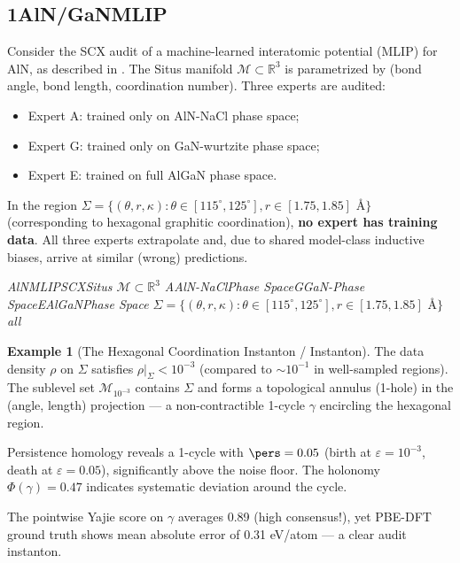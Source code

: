 \documentclass[11pt,a4paper]{article}
\theoremstyle{plain}
\theoremstyle{definition}
\newtheorem{example}[theorem]{Example}
\newcommand{\R}{\mathbb{R}}
\newcommand{\cM}{\mathcal{M}}
\begin{document}
\subsection*{1AlN/GaNMLIP}

Consider the SCX audit of a machine-learned interatomic potential (MLIP) 
for AlN, as described in \cite{scx_framework}. The Situs manifold 
$\cM \subset \R^3$ is parametrized by (bond angle, bond length, coordination 
number). Three experts are audited:

\begin{itemize}
  \item Expert A: trained only on AlN-NaCl phase space;
  \item Expert G: trained only on GaN-wurtzite phase space;
  \item Expert E: trained on full AlGaN phase space.
\end{itemize}

In the region $\Sigma = \{(\theta, r, \kappa) : \theta \in [115^{\circ}, 125^{\circ}], 
r \in [1.75, 1.85] \text{ \AA}\}$ (corresponding to hexagonal graphitic 
coordination), \textbf{no expert has training data}. All three experts 
extrapolate and, due to shared model-class inductive biases, arrive at 
similar (wrong) predictions.

\bigskip
\noindent
\textit{AlNMLIPSCXSitus $\cM \subset \R^3$ AAlN-NaClPhase SpaceGGaN-Phase SpaceEAlGaNPhase Space $\Sigma = \{(\theta, r, \kappa) : \theta \in [115^{\circ}, 125^{\circ}], r \in [1.75, 1.85] \text{ \AA}\}$\textbf{}all}

\begin{example}[The Hexagonal Coordination Instanton / Instanton]
\label{ex:hexagonal}
The data density $\rho$ on $\Sigma$ satisfies $\rho|_{\Sigma} < 10^{-3}$ 
(compared to $\sim 10^{-1}$ in well-sampled regions). The sublevel set 
$\cM_{10^{-3}}$ contains $\Sigma$ and forms a topological annulus 
(1-hole) in the (angle, length) projection — a non-contractible 1-cycle 
$\gamma$ encircling the hexagonal region.

Persistence homology reveals a 1-cycle with $\pers = 0.05$ (birth at 
$\varepsilon = 10^{-3}$, death at $\varepsilon = 0.05$), significantly 
above the noise floor. The holonomy $\Phi(\gamma) = 0.47$ indicates 
systematic deviation around the cycle.

The pointwise Yajie score on $\gamma$ averages 0.89 (high consensus!), 
yet PBE-DFT ground truth shows mean absolute error of 0.31 eV/atom — a 
clear audit instanton.
\end{example}
\end{document}
